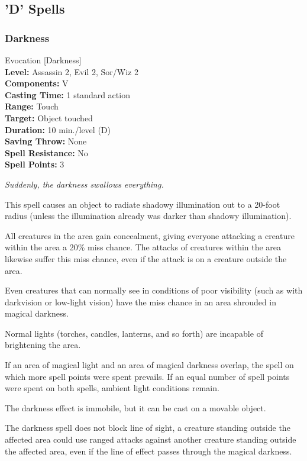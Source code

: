 \subsection{'D' Spells}
\subsubsection{Darkness}
\label{Spell:Darkness}
Evocation [Darkness]
\\ \textbf{Level:} Assassin 2, Evil 2, Sor/Wiz 2
\\ \textbf{Components:} V
\\ \textbf{Casting Time:} 1 standard action
\\ \textbf{Range:} Touch
\\ \textbf{Target:} Object touched
\\ \textbf{Duration:} 10 min./level (D)
\\ \textbf{Saving Throw:} None
\\ \textbf{Spell Resistance:} No
\\ \textbf{Spell Points:} 3

\emph{Suddenly, the darkness swallows everything.}

This spell causes an object to radiate shadowy illumination out to a 20-foot radius 
(unless the illumination already was darker than shadowy illumination).

All creatures in the area gain concealment, giving everyone attacking a creature within the area a 20\% miss chance.
The attacks of creatures within the area likewise suffer this miss chance, even if the attack is on a creature outside the area.

Even creatures that can normally see in conditions of poor visibility
(such as with darkvision or low-light vision) have the miss chance in an area shrouded in magical darkness.

Normal lights (torches, candles, lanterns, and so forth) are incapable of brightening the area.

If an area of magical light and an area of magical darkness overlap, 
the spell on which more spell points were spent prevails.
If an equal number of spell points were spent on both spells, ambient light conditions remain.

The darkness effect is immobile, but it can be cast on a movable object. 

The darkness spell does not block line of sight, a creature standing outside the affected area could use ranged attacks against another creature standing
outside the affected area, even if the line of effect passes through the magical darkness.

